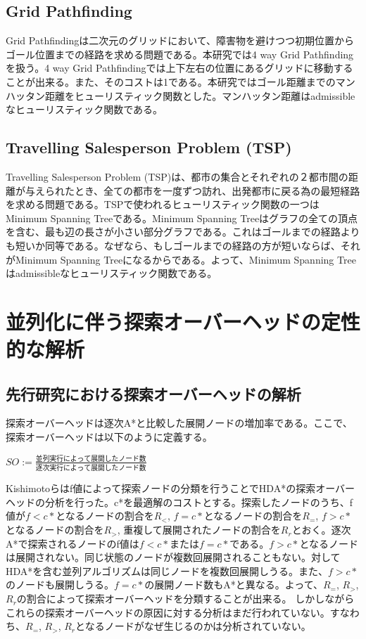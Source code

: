\documentclass{jsarticle}
\begin{document}
\subsection{Grid Pathfinding}

Grid Pathfindingは二次元のグリッドにおいて、障害物を避けつつ初期位置からゴール位置までの経路を求める問題である。本研究では4 way Grid Pathfindingを扱う。4 way Grid Pathfindingでは上下左右の位置にあるグリッドに移動することが出来る。また、そのコストは1である。本研究ではゴール距離までのマンハッタン距離をヒューリスティック関数とした。マンハッタン距離はadmissibleなヒューリスティック関数である。

\subsection{Travelling Salesperson Problem (TSP)}

Travelling Salesperson Problem (TSP)は、都市の集合とそれぞれの２都市間の距離が与えられたとき、全ての都市を一度ずつ訪れ、出発都市に戻る為の最短経路を求める問題である。TSPで使われるヒューリスティック関数の一つはMinimum Spanning Treeである。Minimum Spanning Treeはグラフの全ての頂点を含む、最も辺の長さが小さい部分グラフである。これはゴールまでの経路よりも短いか同等である。なぜなら、もしゴールまでの経路の方が短いならば、それがMinimum Spanning Treeになるからである。よって、Minimum Spanning Treeはadmissibleなヒューリスティック関数である。

\section{並列化に伴う探索オーバーヘッドの定性的な解析}
\label{ch:analysis1}

\subsection{先行研究における探索オーバーヘッドの解析}

探索オーバーヘッドは逐次A*と比較した展開ノードの増加率である。ここで、探索オーバーヘッドは以下のように定義する。

$SO := \frac{並列実行によって展開したノード数}{逐次実行によって展開したノード数}$

Kishimotoらはf値によって探索ノードの分類を行うことでHDA*の探索オーバーヘッドの分析を行った\cite{Kishimoto2013}。c*を最適解のコストとする。探索したノードのうち、f値が$f < c*$となるノードの割合を$R_{<}$, $f = c*$となるノードの割合を$R_{=}$, $f > c*$となるノードの割合を$R_{>}$, 重複して展開されたノードの割合を$R_{r}$とおく。逐次A*で探索されるノードのf値は$f < c*$または$f = c*$である。$f > c*$となるノードは展開されない。同じ状態のノードが複数回展開されることもない。対してHDA*を含む並列アルゴリズムは同じノードを複数回展開しうる。また、$f > c*$のノードも展開しうる。$f = c*$の展開ノード数もA*と異なる。よって、$R_{=}$, $R_{>}$, $R_{r}$の割合によって探索オーバーヘッドを分類することが出来る。
しかしながらこれらの探索オーバーヘッドの原因に対する分析はまだ行われていない。すなわち、$R_{=}$, $R_{>}$, $R_{r}$となるノードがなぜ生じるのかは分析されていない。
\end{document}

